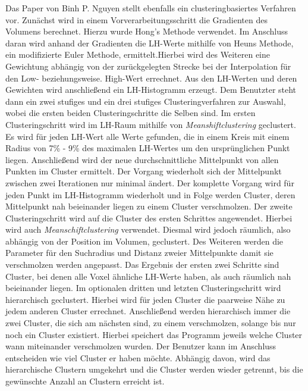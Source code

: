 Das Paper von Binh P. Nguyen \cite{nguyen2012clustering} stellt ebenfalls ein clusteringbasiertes Verfahren vor.
\newline
Zunächst wird in einem Vorverarbeitungsschritt die Gradienten des Volumens berechnet. Hierzu wurde Hong's Methode \cite{hong2003method} verwendet. Im Anschluss daran wird anhand der Gradienten die LH-Werte mithilfe von Heuns Methode, ein modifizierte Euler Methode, ermittelt.Hierbei wird des Weiteren eine Gewichtung abhängig von der zurückgelegten Strecke bei der Interpolation für den Low- beziehungsweise. High-Wert errechnet. Aus den LH-Werten und deren Gewichten wird anschließend ein LH-Histogramm erzeugt.
\newline
Dem Benutzter steht dann ein zwei stufiges und ein drei stufiges Clusteringverfahren zur Auswahl, wobei die ersten beiden Clusteringschritte die Selben sind. 
Im ersten Clusteringschritt wird im LH-Raum mithilfe von \textit{Meanshiftclustering} geclustert. Es wird für jeden LH-Wert alle Werte gefunden, die in einem Kreis mit einem Radius von 7\% - 9\%  des maximalen LH-Wertes um den ursprünglichen Punkt liegen. Anschließend wird der neue durchschnittliche Mittelpunkt von allen Punkten im Cluster ermittelt. Der Vorgang wiederholt sich der Mittelpunkt zwischen zwei Iterationen nur minimal ändert. Der komplette Vorgang wird für jeden Punkt im LH-Histogramm wiederholt und in Folge werden Cluster, deren Mittelpunkt nah beieinander liegen zu einem Cluster verschmolzen.
\newline
Der zweite Clusteringschritt wird auf die Cluster des ersten Schrittes angewendet. Hierbei wird auch \textit{Meanschiftclustering} verwendet. Diesmal wird jedoch räumlich, also abhängig von der Position im Volumen, geclustert. Des Weiteren werden die Parameter für den Suchradius und Distanz zweier Mittelpunkte damit sie verschmolzen werden angepasst.
\newline
Das Ergebnis der ersten zwei Schritte sind Cluster, bei denen alle Voxel ähnliche LH-Werte haben, als auch räumlich nah beieinander liegen.
\newline
Im optionalen dritten und letzten Clusteringschritt wird hierarchisch geclustert. Hierbei wird für jeden Cluster die paarweise Nähe zu jedem anderen Cluster errechnet. Anschließend werden hierarchisch immer die zwei Cluster, die sich am nächsten sind, zu einem verschmolzen, solange bis nur noch ein Cluster existiert.  Hierbei speichert das Programm jeweils welche Cluster wann miteinander verschmolzen wurden. Der Benutzer kann im Anschluss entscheiden wie viel Cluster er haben möchte. Abhängig davon, wird das hierarchische Clustern umgekehrt und die Cluster werden wieder getrennt, bis die gewünschte Anzahl an Clustern erreicht ist.


